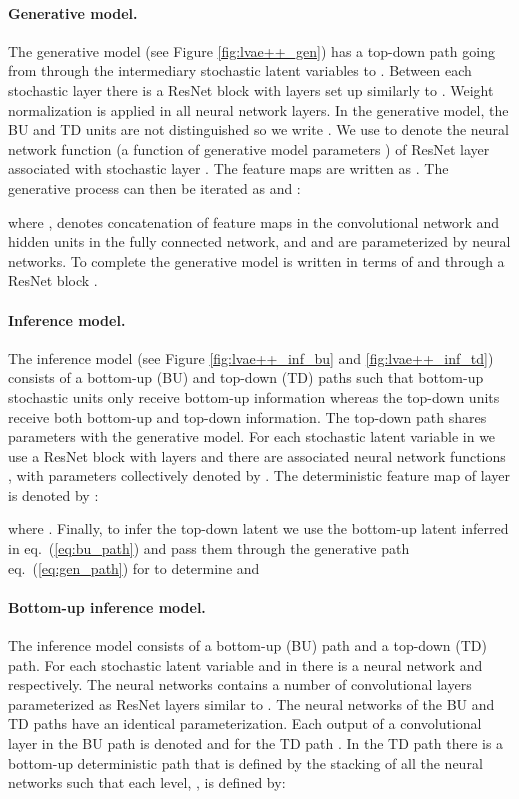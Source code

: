 \documentclass{article}
\begin{document}
\paragraph{Generative model.} The generative model (see Figure \ref{fig:lvae++_gen}) has a top-down path going from  through the intermediary stochastic latent variables to . Between each stochastic layer there is a ResNet block with  layers set up similarly to \citep{Salimans17}. Weight normalization \citep{Salimans2016a} is applied in all neural network layers. In the generative model, the BU and TD units are not distinguished so we write . We use  to denote the neural network function (a function of generative model parameters ) of ResNet layer  associated with stochastic layer . The feature maps are written as . The generative process can then be iterated as  and :

where ,  denotes concatenation of feature maps in the convolutional network and hidden units in the fully connected network,  and  and  are parameterized by neural networks. To complete the generative model  is written in terms of  and  through a ResNet block . 

\paragraph{Inference model.} The inference model (see Figure \ref{fig:lvae++_inf_bu} and \ref{fig:lvae++_inf_td}) consists of a bottom-up (BU) and top-down (TD) paths such that bottom-up stochastic units only receive bottom-up information whereas the top-down units receive both bottom-up and top-down information. The top-down path shares parameters with the generative model. For each stochastic latent variable  in  we use a ResNet block with  layers and there are associated neural network functions ,  with parameters collectively denoted by . The deterministic feature map of layer  is denoted by :

where . Finally, to infer the top-down latent we use the bottom-up latent  inferred in eq.\ (\ref{eq:bu_path}) and pass them through the generative path eq.\ (\ref{eq:gen_path}) for  to determine  and 



\iffalse
\paragraph{Bottom-up inference model.} The inference model consists of a bottom-up (BU) path and a top-down (TD) path. For each stochastic latent variable  and  in  there is a neural network  and  respectively. The neural networks contains a number of convolutional layers  parameterized as ResNet layers similar to \citep{Salimans17}. The neural networks of the BU and TD paths have an identical parameterization. Each output of a convolutional layer in the BU path is denoted  and for the TD path . In the TD path there is a bottom-up deterministic path that is defined by the stacking of all the  neural networks such that each level, , is defined by:
\end{document}
